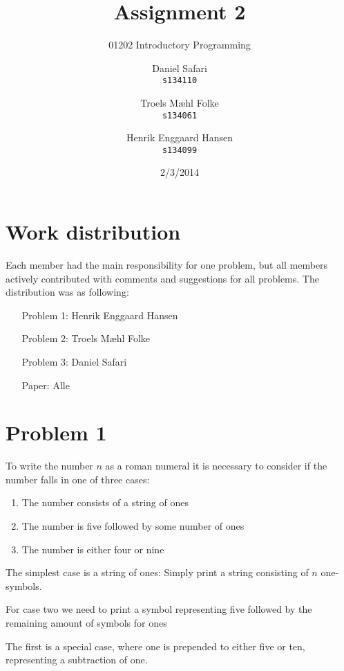 \documentclass{scrartcl}
\begin{document}

\title{Assignment 2}
\subtitle{01202 Introductory Programming}
\author{
  Daniel Safari\\
  \texttt{s134110}
  \and
  Troels Mæhl Folke\\
  \texttt{s134061}
   \and
  Henrik Enggaard Hansen\\
  \texttt{s134099}
}
\date{2/3/2014}
\maketitle
\thispagestyle{empty}
\setcounter{page}{0}
\null
\vfill
\section*{Work distribution}

Each member had the main responsibility for one problem, but all members
actively contributed with comments and suggestions for all problems. The
distribution was as following:
\begin{itemize}
\setlength{\itemindent}{3em}
\item[Problem 1:] Henrik Enggaard Hansen
\item[Problem 2:] Troels Mæhl Folke
\item[Problem 3:] Daniel Safari
\item[Paper:]  Alle
\end{itemize}
\newpage
\section*{Problem 1}

To write the number $n$ as a roman numeral it is necessary to consider if the
number falls in one of three cases:
\begin{enumerate}
\item The number consists of a string of ones
\item The number is five followed by some number of ones
\item The number is either four or nine
\end{enumerate}

The simplest case is a string of ones: Simply print a string consisting of $n$
one-symbols.

For case two we need to print a symbol representing five followed by the
remaining amount of symbols for ones

The first is a special case, where one is prepended to either five or ten,
representing a subtraction of one.
\end{document}
